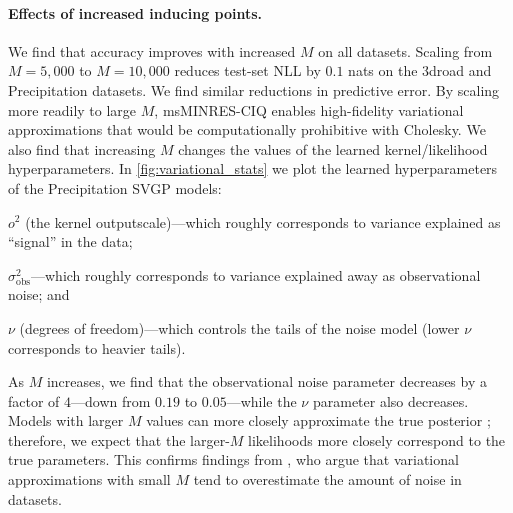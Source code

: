 \paragraph{Effects of increased inducing points.}
We find that accuracy improves with increased $M$ on all datasets.
Scaling from $M=5,\!000$ to $M=10,\!000$ reduces test-set NLL by $0.1$ nats on the 3droad and Precipitation datasets.
We find similar reductions in predictive error.
By scaling more readily to large $M$, msMINRES-CIQ enables high-fidelity variational approximations that would be computationally prohibitive with Cholesky.
We also find that increasing $M$ changes the values of the learned kernel/likelihood hyperparameters.
In \cref{fig:variational_stats} we plot the learned hyperparameters of the Precipitation SVGP models:
%
\begin{enumerate*}
  \item $o^2$ (the kernel outputscale)---which roughly corresponds to variance explained as ``signal'' in the data;
  \item $\sigma^2_\text{obs}$---which roughly corresponds to variance explained away as observational noise; and
  \item $\nu$ (degrees of freedom)---which controls the tails of the noise model (lower $\nu$ corresponds to heavier tails).
\end{enumerate*}
%
As $M$ increases, we find that the observational noise parameter decreases by a factor of $4$---down from $0.19$ to $0.05$---while the $\nu$ parameter also decreases.
Models with larger $M$ values can more closely approximate the true posterior \cite{hensman2013gaussian}; therefore, we expect that the larger-$M$ likelihoods more closely correspond to the true parameters.
This confirms findings from \citet{bauer2016understanding}, who argue that variational approximations with small $M$ tend to overestimate the amount of noise in datasets.
